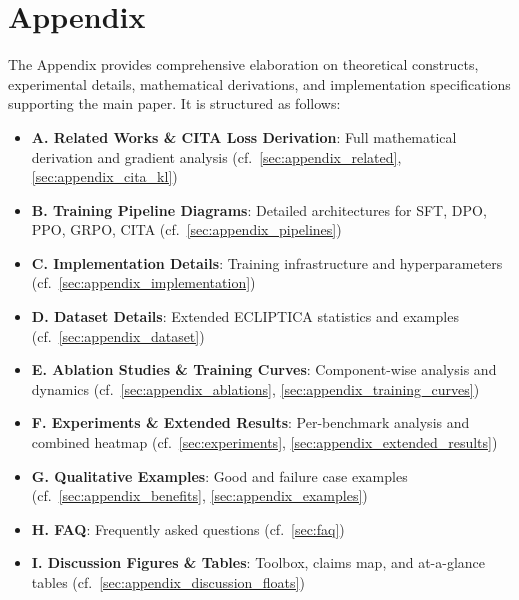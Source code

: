 
\newpage


\section{Appendix}
\label{sec:appendix}

The Appendix provides comprehensive elaboration on theoretical constructs, experimental details, mathematical derivations, and implementation specifications supporting the main paper. It is structured as follows:

\begin{itemize}[leftmargin=*,itemsep=2pt]
    \item \textbf{A. Related Works \& CITA Loss Derivation}: Full mathematical derivation and gradient analysis (cf.~\cref{sec:appendix_related}, \cref{sec:appendix_cita_kl})
    \item \textbf{B. Training Pipeline Diagrams}: Detailed architectures for SFT, DPO, PPO, GRPO, CITA (cf.~\cref{sec:appendix_pipelines})
    \item \textbf{C. Implementation Details}: Training infrastructure and hyperparameters (cf.~\cref{sec:appendix_implementation})
    \item \textbf{D. Dataset Details}: Extended ECLIPTICA statistics and examples (cf.~\cref{sec:appendix_dataset})
    \item \textbf{E. Ablation Studies \& Training Curves}: Component-wise analysis and dynamics (cf.~\cref{sec:appendix_ablations}, \cref{sec:appendix_training_curves})
    \item \textbf{F. Experiments \& Extended Results}: Per-benchmark analysis and combined heatmap (cf.~\cref{sec:experiments}, \cref{sec:appendix_extended_results})
    \item \textbf{G. Qualitative Examples}: Good and failure case examples (cf.~\cref{sec:appendix_benefits}, \cref{sec:appendix_examples})
    \item \textbf{H. FAQ}: Frequently asked questions (cf.~\cref{sec:faq})
    \item \textbf{I. Discussion Figures \& Tables}: Toolbox, claims map, and at-a-glance tables (cf.~\cref{sec:appendix_discussion_floats})
\end{itemize}



